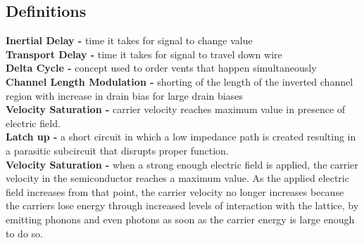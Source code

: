\documentclass[10pt]{article}
\begin{document}
\begin{multicols}{3}
    \subsection*{Definitions}
    \textbf{Inertial Delay -} time it takes for signal to change value \\
    \textbf{Transport Delay -} time it takes for signal to travel down wire \\
    \textbf{Delta Cycle -} concept used to order vents that happen
    simultaneously \\
    \textbf{Channel Length Modulation -} shorting of the length of the inverted
    channel region with increase in drain bias for large drain biases \\
    \textbf{Velocity Saturation -} carrier velocity reaches maximum value in
    presence of electric field. \\
    \textbf{Latch up -} a short circuit in which a low impedance path is
    created resulting in a parasitic subcircuit that disrupts proper function.\\
    \textbf{Velocity Saturation -} when a strong enough electric field is
    applied, the carrier velocity in the semiconductor reaches a maximum value.
    As the applied electric field increases from that point, the carrier
    velocity no longer increases because the carriers lose energy through
    increased levels of interaction with the lattice, by emitting phonons and
    even photons as soon as the carrier energy is large enough to do so.\\


\end{multicols}
\end{document}
